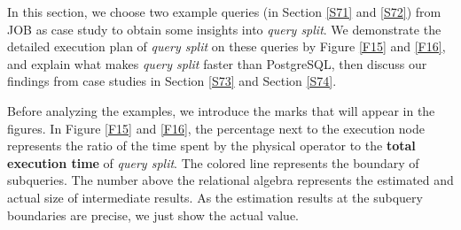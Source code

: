 In this section, we choose two example queries (in Section \ref{S71} and \ref{S72}) from JOB as case study to obtain some insights into \textit{query split}. We demonstrate the detailed execution plan of \textit{query split} on these queries by Figure \ref{F15} and \ref{F16}, and explain what makes \textit{query split} faster than PostgreSQL, then discuss our findings from case studies in Section \ref{S73} and Section \ref{S74}.\par
Before analyzing the examples, we introduce the marks that will appear in the figures. In Figure \ref{F15} and \ref{F16}, the percentage next to the execution node represents the ratio of the time spent by the physical operator to the \textbf{total execution time} of \textit{query split}. The colored line represents the boundary of subqueries. The number above the relational algebra represents the estimated and actual size of intermediate results. As the estimation results at the subquery boundaries are precise, we just show the actual value.


